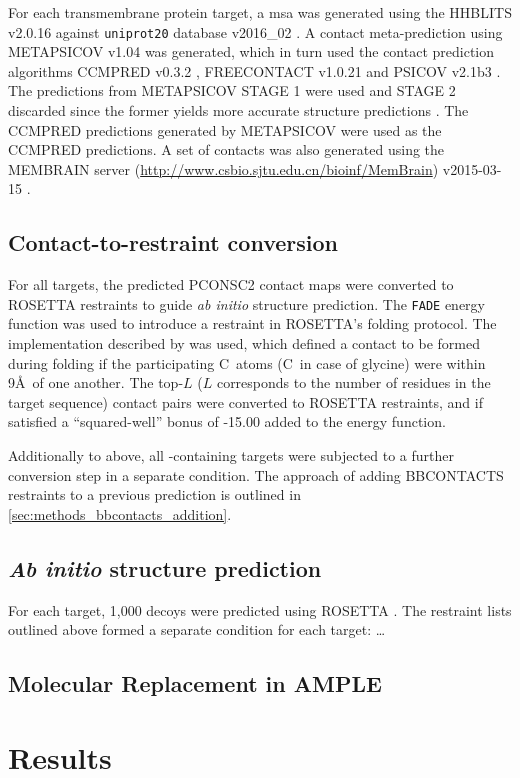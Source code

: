 For each transmembrane protein target, a \gls{msa} was generated using the HHBLITS v2.0.16 \cite{Remmert2011-kt} against \texttt{uniprot20} database v2016\_02 \cite{Bateman2017-pb}. A contact meta-prediction using METAPSICOV v1.04 \cite{Jones2015-vq} was generated, which in turn used the contact prediction algorithms CCMPRED v0.3.2 \cite{Seemayer2014-zp}, FREECONTACT v1.0.21 \cite{Kajan2014-bx} and PSICOV v2.1b3 \cite{Jones2012-ks}. The predictions from METAPSICOV STAGE 1 were used and STAGE 2 discarded since the former yields more accurate structure predictions \cite{Jones2015-vq}. The CCMPRED predictions generated by METAPSICOV were used as the CCMPRED predictions. A set of contacts was also generated using the MEMBRAIN server (\href{http://www.csbio.sjtu.edu.cn/bioinf/MemBrain}{http://www.csbio.sjtu.edu.cn/bioinf/MemBrain}) v2015-03-15 \cite{Yang2013-bf}.

\subsection{Contact-to-restraint conversion} \label{sec:bbcontacts_addition}
For all targets, the predicted PCONSC2 contact maps were converted to ROSETTA restraints to guide \textit{ab initio} structure prediction. The \texttt{FADE} energy function was used to introduce a restraint in ROSETTA’s folding protocol. The implementation described by \textcite{Michel2014-eg} was used, which defined a contact to be formed during folding if the participating C\textbeta\ atoms (C\textalpha\ in case of glycine) were within 9\AA\ of one another. The top-$L$ ($L$ corresponds to the number of residues in the target sequence) contact pairs were converted to ROSETTA restraints, and if satisfied a ``squared-well'' bonus of -15.00 added to the energy function.

Additionally to above, all \textbeta-containing targets were subjected to a further conversion step in a separate condition. The approach of adding BBCONTACTS restraints to a previous prediction is outlined in \cref{sec:methods_bbcontacts_addition}. 

\subsection{\textit{Ab initio} structure prediction}
For each target, 1,000 decoys were predicted using ROSETTA \cite{Rohl2004-dj}. The restraint lists outlined above formed a separate condition for each target: \ldots

\subsection{Molecular Replacement in AMPLE}

\section{Results}


